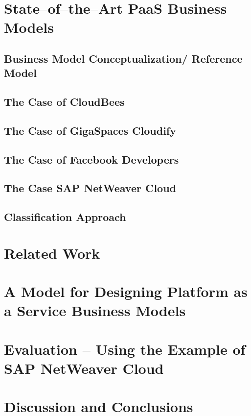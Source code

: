 
\chapter{State--of--the--Art PaaS Business Models}

	\section{Business Model Conceptualization/ Reference Model}
	
	\section{The Case of CloudBees}
	\section{The Case of GigaSpaces Cloudify}
	\section{The Case of Facebook Developers}
	
	\section{The Case SAP NetWeaver Cloud}
	
	\section{Classification Approach}
	

\chapter{Related Work}


\chapter{A Model for Designing Platform as a Service Business Models}

\chapter{Evaluation -- Using the Example of SAP NetWeaver Cloud}

\chapter{Discussion and Conclusions}



